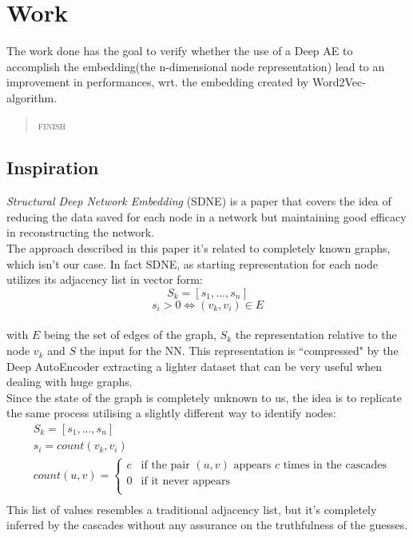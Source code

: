 \documentclass{article}
\begin{document}
		\section{Work}
			The work done has the goal to verify whether the use of a Deep AE to accomplish the embedding(the n-dimensional node representation) lead to an improvement in performances, wrt. the embedding created by Word2Vec-algorithm.
			
			\begin{quote}
				\centering
				\textsc{finish}
			\end{quote}
			
			\subsection{Inspiration}
			\textit{Structural Deep Network Embedding} (SDNE) is a paper that covers the idea of reducing the data saved for each node in a network but maintaining good efficacy in reconstructing the network.\\
			The approach described in this paper it's related to completely known graphs, which isn't our case. In fact SDNE, as starting representation for each node utilizes its adjacency list in vector form:
			$$ S_{k} = [s_{1}, ... , s_{n}] $$
			$$ s_{i} > 0 \iff (v_{k},v_{i})\in E $$\\
			with $E$ being the set of edges of the graph, $S_{k}$ the representation relative to the node $v_{k}$ and $S$ the input for the NN. This representation is \textquotedblleft compressed" by the Deep AutoEncoder extracting a lighter dataset that can be very useful when dealing with huge graphs.\\
			Since the state of the graph is completely unknown to us, the idea is to replicate the same process utilising a slightly different way to identify nodes:
			\begin{equation}
			\begin{aligned}
			& S_{k} = [s_{1}, ... , s_{n}]\\
			& s_{i} = count(v_{k},v_{i})\\
			& count(u,v) =
			\begin{cases}
			c & \text{if the pair } (u,v) \text{  appears } c \text{ times in the cascades}\\
			0 & \text{if it never appears}\\
			\end{cases}\\
			\end{aligned}
			\end{equation}
			This list of values resembles a traditional adjacency list, but it's completely inferred by the cascades without any assurance on the truthfulness of the guesses.\\
			
\end{document}
